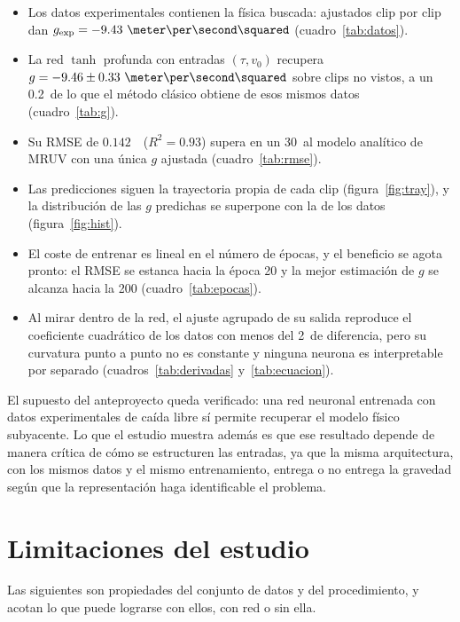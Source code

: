 \documentclass[titlepage,11pt]{article}
\providecommand{\num}[1]{\ensuremath{#1}}
\providecommand{\SI}[2]{#1\,#2}
\providecommand{\percent}{\char37\relax}
\begin{document}
\begin{itemize}
\item Los datos experimentales contienen la física buscada: ajustados clip por
  clip dan $g_{\text{exp}}=\num{-9.43}~\meter\per\second\squared$
  (cuadro~\ref{tab:datos}).
\item La red $\tanh$ profunda con entradas $(\tau,v_0)$ recupera
  $g=\num{-9.46}\pm\num{0.33}~\meter\per\second\squared$ sobre clips no vistos,
  a un \SI{0.2}{\percent} de lo que el método clásico obtiene de esos mismos
  datos (cuadro~\ref{tab:g}).
\item Su RMSE de \num{0.142}~\meter\ ($R^2=\num{0.93}$) supera en un
  \SI{30}{\percent} al modelo analítico de MRUV con una única $g$ ajustada
  (cuadro~\ref{tab:rmse}).
\item Las predicciones siguen la trayectoria propia de cada clip
  (figura~\ref{fig:tray}), y la distribución de las $g$ predichas se superpone
  con la de los datos (figura~\ref{fig:hist}).
\item El coste de entrenar es lineal en el número de épocas, y el beneficio se
  agota pronto: el RMSE se estanca hacia la época 20 y la mejor estimación de
  $g$ se alcanza hacia la 200 (cuadro~\ref{tab:epocas}).
\item Al mirar dentro de la red, el ajuste agrupado de su salida reproduce el
  coeficiente cuadrático de los datos con menos del \SI{2}{\percent} de
  diferencia, pero su curvatura punto a punto no es constante y ninguna neurona
  es interpretable por separado (cuadros~\ref{tab:derivadas}
  y~\ref{tab:ecuacion}).
\end{itemize}

El supuesto del anteproyecto queda verificado: una red neuronal entrenada con
datos experimentales de caída libre sí permite recuperar el modelo físico
subyacente. Lo que el estudio muestra además es que ese resultado depende de
manera crítica de cómo se estructuren las entradas, ya que la misma
arquitectura, con los mismos datos y el mismo entrenamiento, entrega o no
entrega la gravedad según que la representación haga identificable el problema.


\section{Limitaciones del estudio}
\label{sec:limitaciones}

Las siguientes son propiedades del conjunto de datos y del procedimiento, y
acotan lo que puede lograrse con ellos, con red o sin ella.
\end{document}
